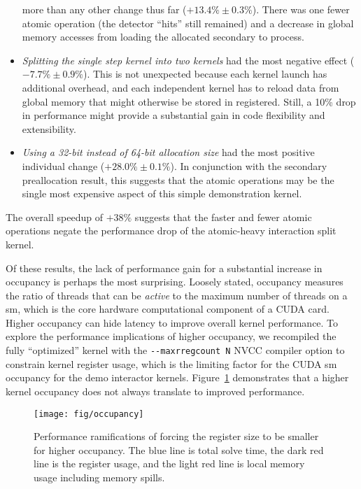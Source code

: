 \documentclass{webofc}
\begin{document}
\begin{itemize}
    more than any other change thus far ($+13.4\% \pm 0.3\%$). There was one
    fewer atomic operation (the detector ``hits'' still remained) and a decrease
    in global
    memory accesses from loading the allocated secondary to process.
  \item \emph{Splitting the single step kernel into two kernels} had the most
    negative effect ($-7.7\% \pm 0.9\%$). This is not unexpected because each
    kernel launch has additional overhead, and each independent kernel has to
    reload data from global memory that might otherwise be stored in registered.
    Still, a 10\% drop in performance might provide a substantial gain in code
    flexibility and extensibility.
  \item \emph{Using a 32-bit instead of 64-bit allocation size} had the most
    positive individual change ($+28.0\% \pm 0.1\%$). In conjunction with the
    secondary preallocation result, this suggests that the atomic operations may
    be the single most expensive aspect of this simple demonstration kernel.
\end{itemize}
%
The overall speedup of $+38\%$ suggests that the faster and fewer atomic
operations negate the performance drop of the atomic-heavy interaction split
kernel.

Of these results, the lack of performance gain for a substantial increase in
occupancy is perhaps the most surprising.
Loosely stated, occupancy measures the ratio of threads that can be
\emph{active} to the maximum number of threads on a \ac{sm},
which is the core hardware computational component of a CUDA card. Higher
occupancy can hide latency to improve overall kernel performance.
To explore the performance implications of higher occupancy, we recompiled the
fully ``optimized'' kernel with the \verb|--maxrregcount N| NVCC
compiler option to constrain kernel register usage,
which is the limiting factor for the CUDA \ac{sm} occupancy for the demo
interactor kernels. Figure~\ref{fig:occupancy} demonstrates that a higher
kernel occupancy does not always translate to improved performance.
%
\begin{figure}[htb]
  \centering
  \texttt{[image: fig/occupancy]}
  \caption{Performance ramifications of forcing the register size to be smaller
  for higher occupancy. The blue line is total solve time, the dark red line is
the register usage, and the light red line is local memory usage including
memory spills.}
  \label{fig:occupancy}
\end{figure}
\end{document}
